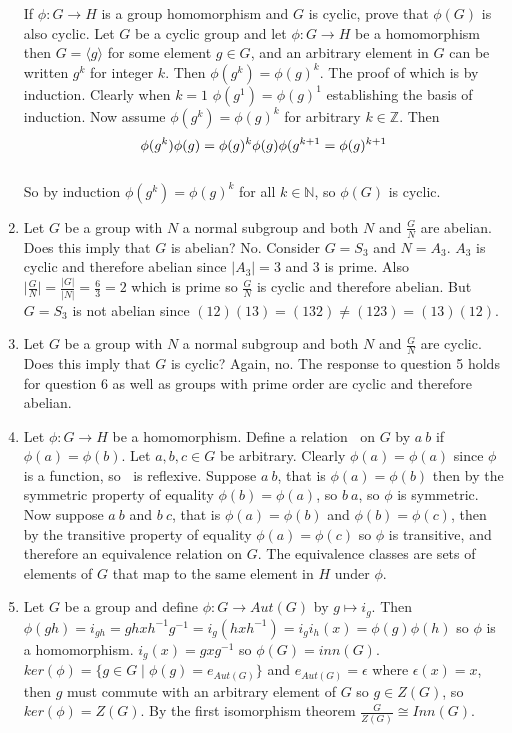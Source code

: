 \documentclass{amsart}
\begin{document}
\begin{enumerate}
  If $\phi: G\to H$ is a group homomorphism and $G$ is cyclic, prove that $\phi(G)$ is also cyclic. Let $G$ be a cyclic group and let $\phi:G\to H$ be a homomorphism then $G=\langle g \rangle$ for some element $g\in G$, and an arbitrary element in $G$ can be written $g^k$ for integer $k$.  Then $\phi(g^k)=\phi(g)^k$.  The proof of which is by induction.  Clearly when $k=1$ $\phi(g^1)=\phi(g)^1$ establishing the basis of induction.  Now assume $\phi(g^k)=\phi(g)^k$ for arbitrary $k\in\mathbb{Z}$.  Then $$\phi(g^k)\phi(g)=\phi(g)^k\phi(g) \\ \phi(g^{k+1}=\phi(g)^{k+1}$$ \\
    So by induction $\phi(g^k)=\phi(g)^k$ for all $k\in\mathbb{N}$, so $\phi(G)$ is cyclic.
    \item Let $G$ be a group with $N$ a normal subgroup and both $N$ and $\frac{G}{N}$ are abelian. Does this imply that $G$ is abelian? No. Consider $G=S_3$ and $N=A_3$.  $A_3$ is cyclic and therefore abelian since $\lvert A_3 \rvert=3$ and $3$ is prime.  Also $\lvert \frac{G}{N} \rvert=\frac{\lvert G \rvert }{\lvert N \rvert }=\frac{6}{3}=2$ which is prime so $\frac{G}{N}$ is cyclic and therefore abelian.  But $G=S_3$ is not abelian since $(12)(13)=(132)\neq(123)=(13)(12)$.
    \item Let $G$ be a group with $N$ a normal subgroup and both $N$ and $\frac{G}{N}$ are cyclic. Does this imply that $G$ is cyclic? Again, no. The response to question 5 holds for question 6 as well as groups with prime order are cyclic and therefore abelian.
    \item Let $\phi:G\to H$ be a homomorphism.  Define a relation $~$ on $G$ by $a~b$ if $\phi(a)=\phi(b)$.  Let $a,b,c\in G$ be arbitrary.  Clearly $\phi(a)=\phi(a)$ since $\phi$ is a function, so $~$ is reflexive.  Suppose $a~b$, that is $\phi(a)=\phi(b)$ then by the symmetric property of equality $\phi(b)=\phi(a)$, so $b~a$, so $\phi$ is symmetric.  Now suppose $a~b$ and $b~c$, that is $\phi(a)=\phi(b)$ and $\phi(b)=\phi(c)$, then by the transitive property of equality $\phi(a)=\phi(c)$ so $\phi$ is transitive, and therefore an equivalence relation on $G$.  The equivalence classes are sets of elements of $G$ that map to the same element in $H$ under $\phi$.
    \item Let $G$ be a group and define $\phi:G\to Aut(G)$ by $g\mapsto i_g$.  Then $\phi(gh)=i_{gh}=ghxh^{-1}g^{-1}=i_g(hxh^{-1})=i_gi_h(x)=\phi(g)\phi(h)$ so $\phi$ is a homomorphism.  $i_g(x)=gxg^{-1}$ so $\phi(G)=inn(G)$.  $ker(\phi)=\{g\in G\mid \phi(g)=e_{Aut(G)}\}$ and $e_{Aut(G)}=\epsilon$ where $\epsilon(x)=x$, then $g$ must commute with an arbitrary element of $G$ so $g\in Z(G)$, so $ker(\phi)=Z(G)$.  By the first isomorphism theorem $\frac{G}{Z(G)}\cong Inn(G)$.

\end{enumerate}
\end{document}
